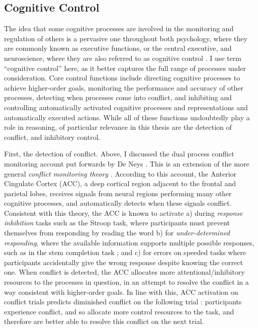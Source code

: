 \subsection{Cognitive Control}
\label{subsec:chapter1-conflict-control}

The idea that some cognitive processes are involved
in the monitoring and regulation of others is a pervasive one
throughout both psychology,
where they are commonly known as executive functions, or the central executive,
and neuroscience,
where they are also referred to as cognitive control
\citep[see, e.g.,][]{Diamond2013,Botvinick2014,
  Botvinick2001,Munakata2011}.
I use term ``cognitive control'' here,
as it better captures the full range of processes under consideration.
Core control functions include
directing cognitive processes to achieve higher-order goals,
monitoring the performance and accuracy of other processes,
detecting when processes come into conflict,
and inhibiting and controlling
automatically activated cognitive processes and representations
and automatically executed actions.
While all of these functions undoubtedly play a role in reasoning,
of particular relevance in this thesis
are the detection of conflict, and inhibitory control.

First, the detection of conflict.
Above, I discussed the dual process conflict monitoring account
put forwards by De Neys \citep[e.g.][]{DeNeys2008a}.
This is an extension of the more general \emph{conflict monitoring theory}
\citep{Botvinick2014,Shenhav2013,Botvinick2004a,Botvinick2001,Yeung2004}.
According to this account,
the Anterior Cingulate Cortex (ACC),
a deep cortical region adjacent to the frontal and parietal lobes,
receives signals from neural regions
performing many other cognitive processes,
and automatically detects when these signals conflict.
Consistent with this theory, the ACC is known to activate
a) during \emph{response inhibition} tasks such as the Stroop task,
where participants must prevent themselves from
responding by reading the word
b) for \emph{under-determined responding},
where the available information supports multiple possible responses,
such as in the stem completion task \citep{Palmer2001}; and
c) for errors on speeded tasks
where participants accidentally give
the wrong response despite knowing the correct one.
When conflict is detected,
the ACC allocates more attentional/inhibitory resources
to the processes in question,
in an attempt to resolve the conflict in a way
consistent with higher-order goals.
In line with this, ACC activation on conflict trials
predicts diminished conflict on the following trial \citep{Rabbitt1966}:
participants experience conflict,
and so allocate more control resources to the task,
and therefore are better able to resolve this conflict on the next trial.


